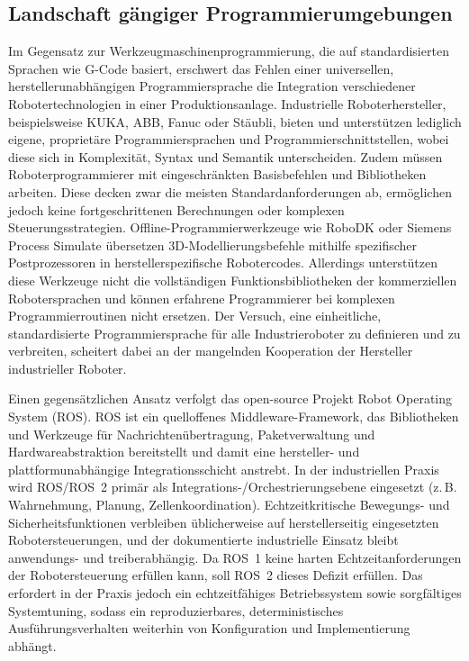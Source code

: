\subsection{Landschaft gängiger Programmierumgebungen}
Im Gegensatz zur
Werkzeugmaschinenprogrammierung, die auf standardisierten Sprachen wie G-Code
basiert, erschwert das Fehlen einer universellen, herstellerunabhängigen
Programmiersprache die Integration verschiedener Robotertechnologien in einer
Produktionsanlage. Industrielle
Roboterhersteller, beispielsweise KUKA, ABB,
Fanuc oder Stäubli, bieten und unterstützen lediglich eigene,
proprietäre Programmiersprachen
und Programmierschnittstellen, wobei diese sich in
Komplexität, Syntax und Semantik
unterscheiden. Zudem müssen Roboterprogrammierer mit
eingeschränkten Basisbefehlen
und Bibliotheken arbeiten. Diese decken zwar die meisten Standardanforderungen
ab, ermöglichen jedoch keine fortgeschrittenen Berechnungen oder komplexen
Steuerungsstrategien. Offline-Programmierwerkzeuge wie RoboDK oder Siemens
Process Simulate übersetzen 3D-Modellierungsbefehle mithilfe spezifischer
Postprozessoren in herstellerspezifische Robotercodes. Allerdings unterstützen
diese Werkzeuge nicht die vollständigen Funktionsbibliotheken der kommerziellen
Robotersprachen und können erfahrene Programmierer bei komplexen
Programmierroutinen nicht ersetzen. Der
Versuch, eine einheitliche, standardisierte Programmiersprache für
alle Industrieroboter zu definieren und zu
verbreiten, scheitert dabei an der mangelnden Kooperation der
Hersteller industrieller Roboter.

Einen gegensätzlichen Ansatz verfolgt das open-source Projekt
Robot Operating System (ROS). ROS ist ein quelloffenes
Middleware-Framework, das Bibliotheken und Werkzeuge für
Nachrichtenübertragung, Paketverwaltung und Hardwareabstraktion
bereitstellt und damit eine hersteller- und
plattformunabhängige Integrationsschicht
anstrebt. In der industriellen Praxis wird
ROS/ROS~2 primär als Integrations-/Orchestrierungsebene
eingesetzt (z.\,B. Wahrnehmung, Planung, Zellenkoordination).
Echtzeitkritische Bewegungs- und Sicherheitsfunktionen verbleiben
üblicherweise auf herstellerseitig eingesetzten Robotersteuerungen, und der
dokumentierte industrielle Einsatz bleibt anwendungs- und
treiberabhängig. Da ROS~1
keine harten Echtzeitanforderungen der Robotersteuerung erfüllen
kann, soll ROS~2 dieses Defizit erfüllen.
Das erfordert in der Praxis jedoch ein echtzeitfähiges
Betriebssystem sowie sorgfältiges Systemtuning,
sodass ein reproduzierbares, deterministisches Ausführungsverhalten
weiterhin von Konfiguration und
Implementierung
abhängt.

